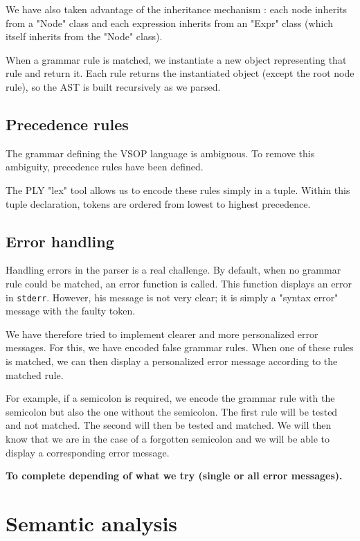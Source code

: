 \documentclass[a4paper, 12pt]{article}
\begin{document}
    We have also taken advantage of the inheritance mechanism : each node inherits from a "Node" class and each expression inherits from an "Expr" class (which itself inherits from the "Node" class).
    
    When a grammar rule is matched, we instantiate a new object representing that rule and return it. Each rule returns the instantiated object (except the root node rule), so the AST is built recursively as we parsed.
    
    \subsection{Precedence rules}
    
    The grammar defining the VSOP language is ambiguous. To remove this ambiguity, precedence rules have been defined.
    
    The PLY "lex" tool allows us to encode these rules simply in a tuple. Within this tuple declaration, tokens are ordered from lowest to highest precedence.
    
    \subsection{Error handling}
    
    Handling errors in the parser is a real challenge. By default, when no grammar rule could be matched, an error function is called. This function displays an error in \texttt{stderr}. However, his message is not very clear; it is simply a "syntax error" message with the faulty token.
    
    We have therefore tried to implement clearer and more personalized error messages. For this, we have encoded false grammar rules. When one of these rules is matched, we can then display a personalized error message according to the matched rule.
    
    For example, if a semicolon is required, we encode the grammar rule with the semicolon but also the one without the semicolon. The first rule will be tested and not matched. The second will then be tested and matched. We will then know that we are in the case of a forgotten semicolon and we will be able to display a corresponding error message.
    
    {\bf To complete depending of what we try (single or all error messages).}
    
    
    \section{Semantic analysis}
    
\end{document}
